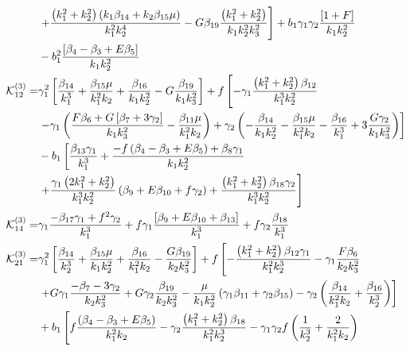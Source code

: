 \begin{align*}
&\left. + \frac{\left( k_1^2 + k_2^2 \right) \left( k_1 \beta_{14} + k_2 \beta_{15} \mu \right) }{k_1^2 k_2^4}  - G \beta_{19} \frac{\left( k_1^2 + k_2^2 \right)}{k_1 k_2^2 k_3^2}  \right] + b_1 \gamma_1 \gamma_2 \frac{\left[ 1 + F\right]}{k_1 k_2^2} \\
& - b_1^2 \frac{\left[ {\beta_{4}-\beta_{3}} + E \beta_{5}\right]}{k_1 k_2^2} \\
\ko_{12}^{(3)}=& \gamma_1^2 \left[ \frac{\beta_{14}}{k_1^3} + \frac{\beta_{15} \mu}{k_1^2 k_2} + \frac{\beta_{16}}{k_1 k_2^2} - G \frac{\beta_{19}}{k_1 k_3^2} \right] + f \left[ - \gamma_1 \frac{\left( k_1^2 + k_2^2 \right) \beta_{12}}{k_1^3 k_2^2} \right. \\
&\left. - \gamma_1 \left( \frac{F \beta_{6} + G \left[ \beta_{7} + 3 \gamma_2 \right]}{k_1 k_3^2} - \frac{\beta_{11} \mu }{k_1^2 k_2 }  \right) + \gamma_2 \left( - \frac{\beta_{14}}{k_1 k_2^2} - \frac{\beta_{15} \mu }{k_1^2 k_2} - \frac{\beta_{16}}{k_1^3} + 3 \frac{G \gamma_2}{k_1 k_3^2} \right) \right] \\
& - b_1 \left[ \frac{\beta_{13} \gamma_1}{k_1^3} + \frac{-f \left({\beta_{4}-\beta_{3}} + E \beta_{5} \right) + \beta_{8} \gamma_1}{k_1 k_2^2 } \right. \\
&\left. + \frac{\gamma_1 \left(2 k_1^2 + k_2^2\right)}{k_1^3 k_2^2} \left( \beta_{9} + E \beta_{10} + f \gamma_2 \right) + \frac{\left(k_1^2 + k_2^2\right) \beta_{18} \gamma_2}{k_1^3 k_2^2}  \right]\\
\ko_{14}^{(3)}=& \gamma_1 \frac{- \beta_{17} \gamma_1 + f^2 \gamma_2}{k_1^3} + f \gamma_1 \frac{\left[ \beta_{9} + E \beta_{10} + \beta_{13} \right]}{k_1^3} + f \gamma_2\frac{\beta_{18}}{k_1^3}\\
\ko_{21}^{(3)}=& \gamma_1^2 \left[  \frac{\beta_{14}}{k_2^3} + \frac{\beta_{15} \mu }{k_1 k_2^2} + \frac{\beta_{16}}{k_1^2 k_2} - \frac{G \beta_{19}}{k_2 k_3^2} \right] + f \left[  -\frac{\left( k_1^2 + k_2^2 \right)\beta_{12} \gamma_1 }{k_1^2 k_2^3}  - \gamma_1 \frac{F \beta_{6}}{k_2 k_3^2} \right. \\
&\left. +  G \gamma_1 \frac{-\beta_{7} - 3 \gamma_2}{k_2 k_3^2} + G \gamma_2 \frac{\beta_{19}}{k_2 k_3^2} - \frac{\mu}{k_1 k_2^2} \left( \gamma_1 \beta_{11} + \gamma_2 \beta_{15} \right) - \gamma_2 \left( \frac{\beta_{14}}{k_1^2 k_2} + \frac{\beta_{16}}{k_2^3} \right) \right] \\
&+ b_1 \left[ f \frac{\left( {\beta_{4}-\beta_{3}} + E \beta_{5} \right)}{k_1^2 k_2} - \gamma_2 \frac{\left( k_1^2 + k_2^2\right) \beta_{18}}{k_1^2 k_2^3} - \gamma_1 \gamma_2 f \left( \frac{1}{k_2^3} + \frac{2}{k_1^2 k_2}\right) \right. \\

\end{align*}
